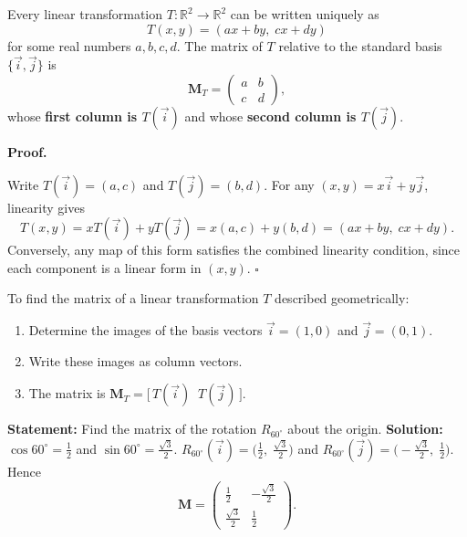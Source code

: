 \documentclass[11pt]{article}
\newcommand{\cle}[1]{{\popxbold\color{popdark}#1}}
\begin{document}
\begin{propriete}
Every linear transformation $T : \mathbb{R}^2 \to \mathbb{R}^2$ can be written uniquely as
\[
T(x,y) = (ax+by,\; cx+dy)
\]
for some real numbers $a,b,c,d$. The \cle{matrix of $T$} relative to the standard basis $\{\vec{i},\vec{j}\}$ is
\[
\mathbf{M}_T = \begin{pmatrix} a & b \\ c & d \end{pmatrix},
\]
whose \textbf{first column is $T(\vec{i})$} and whose \textbf{second column is $T(\vec{j})$}.
\end{propriete}

\textbf{Proof.}\par
Write $T(\vec{i}) = (a,c)$ and $T(\vec{j}) = (b,d)$. For any $(x,y) = x\vec{i}+y\vec{j}$, linearity gives
\[
T(x,y) = xT(\vec{i})+yT(\vec{j}) = x(a,c)+y(b,d) = (ax+by,\; cx+dy).
\]
Conversely, any map of this form satisfies the combined linearity condition, since each component is a linear form in $(x,y)$. \hfill$\square$

\begin{methode}
To find the matrix of a linear transformation $T$ described geometrically:
\begin{enumerate}
    \item Determine the images of the basis vectors $\vec{i}=(1,0)$ and $\vec{j}=(0,1)$.
    \item Write these images as column vectors.
    \item The matrix is $\mathbf{M}_T = \bigl[\,T(\vec{i})\;\; T(\vec{j})\,\bigr]$.
\end{enumerate}
\end{methode}

\begin{exoresolu}
\noindent\textbf{Statement:} Find the matrix of the rotation $R_{60^\circ}$ about the origin.
\tcblower
\noindent\textbf{Solution:}
$\cos60^\circ = \tfrac12$ and $\sin60^\circ = \tfrac{\sqrt3}{2}$.
$R_{60^\circ}(\vec{i}) = \bigl(\tfrac12,\; \tfrac{\sqrt3}{2}\bigr)$ and $R_{60^\circ}(\vec{j}) = \bigl(-\tfrac{\sqrt3}{2},\; \tfrac12\bigr)$.
Hence
\[
\mathbf{M} = \begin{pmatrix} \frac12 & -\frac{\sqrt3}{2} \\[2pt] \frac{\sqrt3}{2} & \frac12 \end{pmatrix}.
\]
\end{exoresolu}
\end{document}
